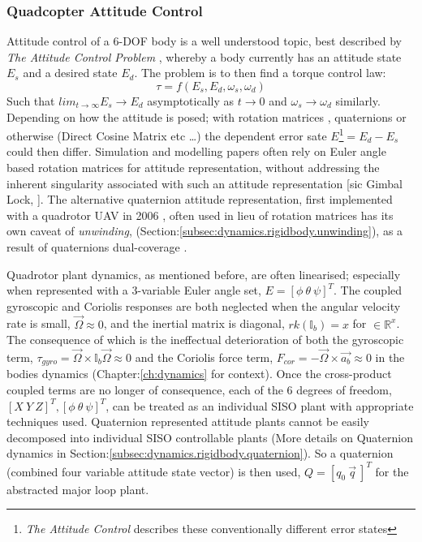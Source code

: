 \subsubsection*{Quadcopter Attitude Control}
Attitude control of a 6-DOF body is a well understood topic, best described by \emph{The Attitude Control Problem} \cite{attitudecontrolproblem}, whereby a body currently has an attitude state $E_s$ and a desired state $E_d$. The problem is to then find a torque control law:
\begin{equation} \label{eq:2}
\tau = f(E_s,E_d,\omega_s,\omega_d)
\end{equation}
Such that $lim_{t\rightarrow\infty}E_s \rightarrow E_d$ asymptotically as $t \rightarrow 0$ and $\omega_s \rightarrow \omega_d$ similarly. Depending on how the attitude is posed; with rotation matrices \cite{rigidbodylecture,eulerrigidbody,rotationsequences}, quaternions \cite{quaterniondynamics, rotationsequences, spacecraftattitutdequaternions} or otherwise (Direct Cosine Matrix etc \ldots) the dependent error sate $E$\footnote{\emph{The Attitude Control} \cite{attitudecontrolproblem} describes these conventionally different error states}$= E_d - E_s$ could then differ. Simulation and modelling papers often rely on Euler angle based rotation matrices for attitude representation, \cite{quadsimulationcontrol, adaptivedisturbancecontrol, optimizedpidquadcopter, singleaxistilting, backsteppingquadcoptercontrol, fullquadcoptercontrol} without addressing the inherent singularity associated with such an attitude representation [sic Gimbal Lock, \cite{euleranglesingularity}]. The alternative quaternion attitude representation, first implemented with a quadrotor UAV in 2006 \cite{attitudestabilization}, often used in lieu of rotation matrices has its own caveat of \emph{unwinding}, (Section:\ref{subsec:dynamics.rigidbody.unwinding}), as a result of quaternions dual-coverage \cite{unwinding}.
\par
Quadrotor plant dynamics, as mentioned before, are often linearised; especially when represented with a 3-variable Euler angle set, $E = [\phi ~\theta ~\psi]^T$. The coupled gyroscopic and Coriolis responses are both neglected when the angular velocity rate is small, $\vec{\Omega} \approx 0$, and the inertial matrix is diagonal, $rk(\mathbb{I}_b)= x$ for $\in\mathbb{R}^x$. The consequence of which is the ineffectual deterioration of both the gyroscopic term, $\tau_{gyro}=\vec{\Omega} \times \mathbb{I}_b\vec{\Omega} \approx 0$ and the  Coriolis force term, $F_{cor}=-\vec{\Omega} \times \vec{a_b} \approx 0$ in the bodies dynamics (Chapter:\ref{ch:dynamics} for context). Once the cross-product coupled terms are no longer of consequence, each of the 6 degrees of freedom, $[X ~Y ~Z]^T, [\phi ~\theta ~\psi]^T$, can be treated as an individual SISO plant with appropriate techniques used. Quaternion represented attitude plants \cite{} cannot be easily decomposed into individual SISO controllable plants (More details on Quaternion dynamics in Section:\ref{subsec:dynamics.rigidbody.quaternion}). So a quaternion (combined four variable attitude state vector) is then used, $Q = [q_0 ~\vec{q}\>]^T$ for the abstracted major loop plant.
